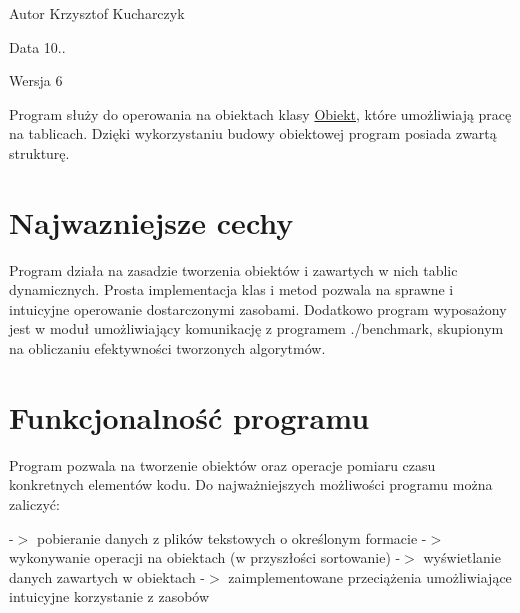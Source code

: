 \begin{DoxyAuthor}{\-Autor}
\-Krzysztof \-Kucharczyk 
\end{DoxyAuthor}
\begin{DoxyDate}{\-Data}
10.. 
\end{DoxyDate}
\begin{DoxyVersion}{\-Wersja}
6
\end{DoxyVersion}
\-Program służy do operowania na obiektach klasy \hyperlink{class_obiekt}{\-Obiekt}, które umożliwiają pracę na tablicach. \-Dzięki wykorzystaniu budowy obiektowej program posiada zwartą strukturę.\hypertarget{index_etykieta-wazne-cechy}{}\section{\-Najwazniejsze cechy}\label{index_etykieta-wazne-cechy}
\-Program działa na zasadzie tworzenia obiektów i zawartych w nich tablic dynamicznych. \-Prosta implementacja klas i metod pozwala na sprawne i intuicyjne operowanie dostarczonymi zasobami. \-Dodatkowo program wyposażony jest w moduł umożliwiający komunikację z programem ./benchmark, skupionym na obliczaniu efektywności tworzonych algorytmów.\hypertarget{index_etykieta-mozliwosci}{}\section{\-Funkcjonalność programu}\label{index_etykieta-mozliwosci}
\-Program pozwala na tworzenie obiektów oraz operacje pomiaru czasu konkretnych elementów kodu. \-Do najważniejszych możliwości programu można zaliczyć\-:

-\/$>$ pobieranie danych z plików tekstowych o określonym formacie -\/$>$ wykonywanie operacji na obiektach (w przyszłości sortowanie) -\/$>$ wyświetlanie danych zawartych w obiektach -\/$>$ zaimplementowane przeciążenia umożliwiające intuicyjne korzystanie z zasobów 